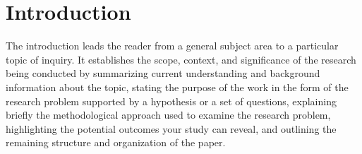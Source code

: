 \documentclass[twocolumn,showpacs,amsmath,amssymb]{revtex4}
\begin{document}
\maketitle

\section{Introduction}

The introduction leads the reader from a general subject area to a particular topic of inquiry. It establishes the scope, context, and significance of the research being conducted by summarizing current understanding and background information about the topic, stating the purpose of the work in the form of the research problem supported by a hypothesis or a set of questions, explaining briefly the methodological approach used to examine the research problem, highlighting the potential outcomes your study can reveal, and outlining the remaining structure and organization of the paper.

\end{document}

